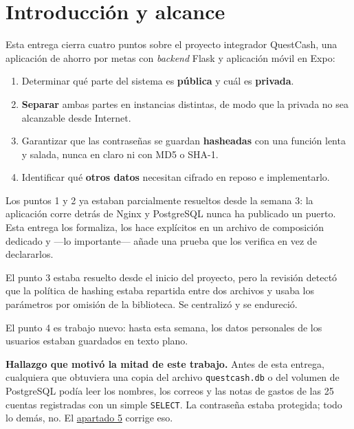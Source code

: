 \documentclass[11pt,letterpaper]{article}
\begin{document}
\tableofcontents
\newpage

\section{Introducción y alcance}

Esta entrega cierra cuatro puntos sobre el proyecto integrador QuestCash, una
aplicación de ahorro por metas con \emph{backend} Flask y aplicación móvil en
Expo:

\begin{enumerate}[leftmargin=1.6em,itemsep=3pt]
  \item Determinar qué parte del sistema es \textbf{pública} y cuál es
        \textbf{privada}.
  \item \textbf{Separar} ambas partes en instancias distintas, de modo que la
        privada no sea alcanzable desde Internet.
  \item Garantizar que las contraseñas se guardan \textbf{hasheadas} con una
        función lenta y salada, nunca en claro ni con MD5 o SHA-1.
  \item Identificar qué \textbf{otros datos} necesitan cifrado en reposo e
        implementarlo.
\end{enumerate}

Los puntos 1 y 2 ya estaban parcialmente resueltos desde la semana 3: la
aplicación corre detrás de Nginx y PostgreSQL nunca ha publicado un puerto.
Esta entrega los formaliza, los hace explícitos en un archivo de composición
dedicado y —lo importante— añade una prueba que los verifica en vez de
declararlos.

El punto 3 estaba resuelto desde el inicio del proyecto, pero la revisión
detectó que la política de hashing estaba repartida entre dos archivos y usaba
los parámetros por omisión de la biblioteca. Se centralizó y se endureció.

El punto 4 es trabajo nuevo: hasta esta semana, los datos personales de los
usuarios estaban guardados en texto plano.

\begin{alerta}
\textbf{Hallazgo que motivó la mitad de este trabajo.} Antes de esta entrega,
cualquiera que obtuviera una copia del archivo \texttt{questcash.db} o del
volumen de PostgreSQL podía leer los nombres, los correos y las notas de
gastos de las 25 cuentas registradas con un simple \texttt{SELECT}. La
contraseña estaba protegida; todo lo demás, no. El
\hyperref[sec:cifrado]{apartado 5} corrige eso.
\end{alerta}
\end{document}
